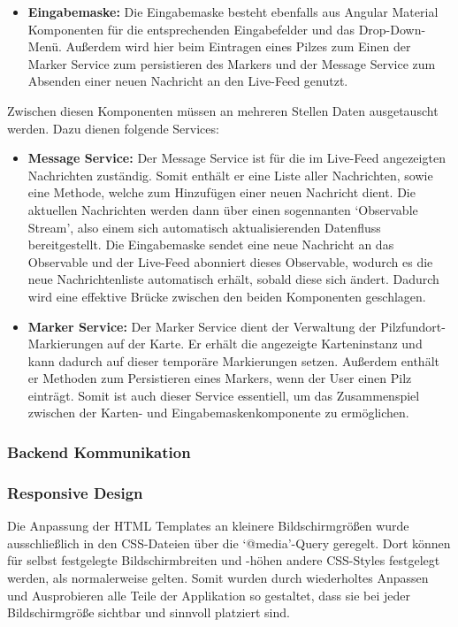 \documentclass[../main.tex]{subfiles} %
\begin{document}
\begin{itemize}
  \item \textbf{Eingabemaske:}
        Die Eingabemaske besteht ebenfalls aus Angular Material Komponenten für die entsprechenden Eingabefelder und das Drop-Down-Menü. Außerdem wird
        hier beim Eintragen eines Pilzes zum Einen der Marker Service zum persistieren des Markers und der Message Service zum Absenden einer neuen 
        Nachricht an den Live-Feed genutzt.

\end{itemize}

Zwischen diesen Komponenten müssen an mehreren Stellen Daten ausgetauscht werden. Dazu dienen folgende Services:

\begin{itemize}

	\item \textbf{Message Service:}
	      Der Message Service ist für die im Live-Feed angezeigten Nachrichten zuständig. Somit enthält er eine Liste aller Nachrichten, sowie eine Methode,
        welche zum Hinzufügen einer neuen Nachricht dient. Die aktuellen Nachrichten werden dann über einen sogennanten `Observable Stream', also einem
        sich automatisch aktualisierenden Datenfluss bereitgestellt. Die Eingabemaske sendet eine neue Nachricht an das Observable und der Live-Feed
        abonniert dieses Observable, wodurch es die neue Nachrichtenliste automatisch erhält, sobald diese sich ändert. Dadurch wird eine effektive 
        Brücke zwischen den beiden Komponenten geschlagen.

  \item \textbf{Marker Service:}
        Der Marker Service dient der Verwaltung der Pilzfundort-Markierungen auf der Karte. Er erhält die angezeigte Karteninstanz und kann dadurch auf 
        dieser temporäre Markierungen setzen. Außerdem enthält er Methoden zum Persistieren eines Markers, wenn der User einen Pilz einträgt. Somit ist 
        auch dieser Service essentiell, um das Zusammenspiel zwischen der Karten- und Eingabemaskenkomponente zu ermöglichen.

\end{itemize}

\subsubsection{Backend Kommunikation}  %

\subsubsection{Responsive Design}

Die Anpassung der HTML Templates an kleinere Bildschirmgrößen wurde ausschließlich in den CSS-Dateien über die `@media'-Query geregelt. Dort können für
selbst festgelegte Bildschirmbreiten und -höhen andere CSS-Styles festgelegt werden, als normalerweise gelten. Somit wurden durch wiederholtes Anpassen
und Ausprobieren alle Teile der Applikation so gestaltet, dass sie bei jeder Bildschirmgröße sichtbar und sinnvoll platziert sind.
\end{document}
